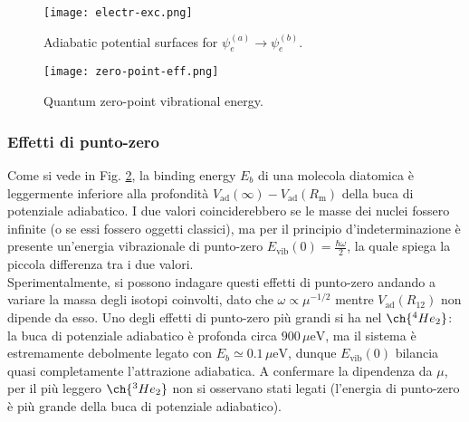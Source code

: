 \begin{figure}
	\centering
	\texttt{[image: electr-exc.png]}
	\caption{Adiabatic potential surfaces for $ \psi_e^{(a)} \rightarrow \psi_e^{(b)} $.}
	\label{elec-ex}
\end{figure}
\begin{figure}
	\centering
	\texttt{[image: zero-point-eff.png]}
	\caption{Quantum zero-point vibrational energy.}
	\label{zero-p}
\end{figure}

\subsubsection{Effetti di punto-zero}

Come si vede in Fig. \ref{zero-p}, la binding energy $ E_b $ di una molecola diatomica è leggermente inferiore alla profondità $ V_\text{ad}(\infty) - V_\text{ad}(R_\text{m}) $ della buca di potenziale adiabatico. I due valori coinciderebbero se le masse dei nuclei fossero infinite (o se essi fossero oggetti classici), ma per il principio d'indeterminazione è presente un'energia vibrazionale di punto-zero $ E_\text{vib}(0) = \frac{\hbar \omega}{2} $, la quale spiega la piccola differenza tra i due valori. \\
Sperimentalmente, si possono indagare questi effetti di punto-zero andando a variare la massa degli isotopi coinvolti, dato che $ \omega \propto \mu^{-1/2} $ mentre $ V_\text{ad}(R_{12}) $ non dipende da esso. Uno degli effetti di punto-zero più grandi si ha nel $ \ch{^4He_2} $: la buca di potenziale adiabatico è profonda circa $ 900 \,\mu\text{eV} $, ma il sistema è estremamente debolmente legato con $ E_b \simeq 0.1 \,\mu\text{eV} $, dunque $ E_\text{vib}(0) $ bilancia quasi completamente l'attrazione adiabatica. A confermare la dipendenza da $ \mu $, per il più leggero $ \ch{^3He_2} $ non si osservano stati legati (l'energia di punto-zero è più grande della buca di potenziale adiabatico).











